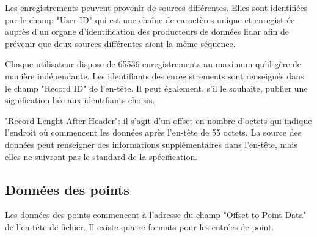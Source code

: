 Les enregistrements peuvent provenir de sources différentes.
Elles sont identifiées par le champ "User ID" qui est une chaîne de caractères unique et enregistrée auprès d'un organe d'identification des producteurs de données lidar afin de prévenir que deux sources différentes aient la même séquence.

Chaque utilisateur dispose de 65536 enregistrements au maximum qu'il gère de manière indépendante.
Les identifiants des enregistrements sont renseignés dans le champ "Record ID" de l'en-tête.
Il peut également, s'il le souhaite, publier une signification liée aux identifiants choisis.

"Record Lenght After Header": il s'agit d'un offset en nombre d'octets qui indique l'endroit où commencent les données après l'en-tête de 55 octets.
La source des données peut renseigner des informations supplémentaires dans l'en-tête, mais elles ne suivront pas le standard de la spécification.

\subsection{Données des points}

Les données des points commencent à l'adresse du champ "Offset to Point Data" de l'en-tête de fichier.
Il existe quatre formats pour les entrées de point.

